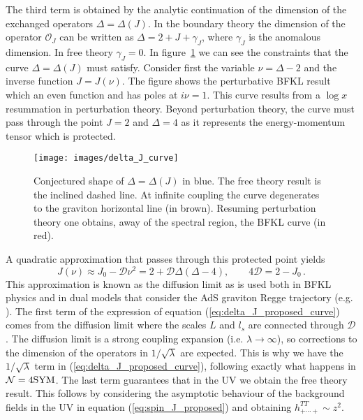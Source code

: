 \documentclass[a4paper,12pt]{article}
\begin{document}
The third term is obtained by the analytic continuation of the dimension of the exchanged operators $\Delta = \Delta\left(J\right)$. In the boundary theory the dimension of the operator $\mathcal{O}_J$ can be written as $\Delta = 2 + J + \gamma_J$, where $\gamma_J$ is the anomalous dimension. In free theory $\gamma_J = 0$. In figure~\ref{fig:delta_J_curve} we can see the constraints that the curve $\Delta = \Delta(J)$ must satisfy. Consider first the variable $\nu = \Delta - 2$ and the inverse function $J = J\left(\nu\right)$. The figure shows the perturbative BFKL result which an even function and has poles at $i \nu = 1$. This curve results from a $\log x$ resummation in perturbation theory. Beyond perturbation theory, the curve must pass through the point $J = 2$ and $\Delta = 4$ as it represents the energy-momentum tensor which is protected.
\begin{figure}[!t]
  \center
  \texttt{[image: images/delta\_J\_curve]} 
  \caption{Conjectured shape of $\Delta = \Delta(J)$ in blue. The free theory result is the inclined dashed line. At infinite coupling the curve degenerates to the graviton horizontal line (in brown). Resuming perturbation theory one obtains, away of the spectral region, the BFKL curve (in red).}
  \label{fig:delta_J_curve}
\end{figure}
A quadratic approximation that passes through this protected point yields
\begin{equation}
J(\nu) \approx J_0 - \mathcal{D} \nu^2 = 2 + \mathcal{D} \Delta \left( \Delta - 4 \right), \qquad 4 \mathcal{D} = 2 - J_0 \, .
\end{equation}
This approximation is known as the diffusion limit as is used both in BFKL physics and in dual models that consider the AdS graviton Regge trajectory (e.g. \cite{Costa:2012fw}).
The first term of the expression of equation (\ref{eq:delta_J_proposed_curve}) comes from the diffusion limit where the scales $L$ and $l_s$ are connected through $\mathcal{D}$. The diffusion limit is a strong coupling expansion (i.e. $\lambda \to \infty$), so corrections to the dimension of the operators in $1 / \sqrt{\lambda}$ are expected. This is why we have the $1 / \sqrt{\lambda}$ term in (\ref{eq:delta_J_proposed_curve}), following exactly what happens in $\mathcal{N} = 4 \rm{SYM}$. The last term guarantees that in the UV  we obtain the free theory result. This follows by considering the asymptotic behaviour of the background fields in the UV in equation (\ref{eq:spin_J_proposed}) and obtaining $h^{TT}_{+\cdots+} \sim z^2$.
\end{document}
